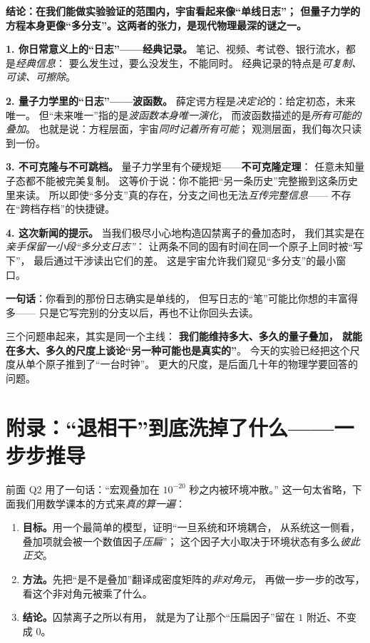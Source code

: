 \documentclass[11pt,a4paper]{ctexart}
\begin{document}
\begin{answerblock}
\textbf{结论：在我们能做实验验证的范围内，宇宙看起来像``单线日志''；
但量子力学的方程本身更像``多分支''。这两者的张力，是现代物理最深的谜之一。}

\smallskip
\textbf{1. 你日常意义上的``日志''——经典记录。}
笔记、视频、考试卷、银行流水，都是\emph{经典信息}：
要么发生过，要么没发生，不能同时。
经典记录的特点是\emph{可复制、可读、可擦除}。

\smallskip
\textbf{2. 量子力学里的``日志''——波函数。}
薛定谔方程是\emph{决定论}的：给定初态，未来唯一。
但``未来唯一''指的是\emph{波函数本身唯一演化}，
而波函数描述的是\emph{所有可能的叠加}。
也就是说：方程层面，宇宙\emph{同时记着所有可能}；
观测层面，我们每次只读到一份。

\smallskip
\textbf{3. 不可克隆与不可跳档。}
量子力学里有个硬规矩——\textbf{不可克隆定理}：
任意未知量子态都不能被完美复制。
这等价于说：你不能把``另一条历史''完整搬到这条历史里来读。
所以即使``多分支''真的存在，分支之间也无法\emph{互传完整信息}——
不存在``跨档存档''的快捷键。

\smallskip
\textbf{4. 这次新闻的提示。}
当我们极尽小心地构造囚禁离子的叠加态时，
我们其实是在\emph{亲手保留一小段``多分支日志''}：
让两条不同的固有时间在同一个原子上同时被``写下''，
最后通过干涉读出它们的差。
这是宇宙允许我们窥见``多分支''的最小窗口。

\smallskip
\textbf{一句话}：你看到的那份日志确实是单线的，
但写日志的``笔''可能比你想的丰富得多——
只是它写完别的分支以后，再也不让你回头去读。
\end{answerblock}

\begin{keypointblock}
三个问题串起来，其实是同一个主线：
\textbf{我们能维持多大、多久的量子叠加，
就能在多大、多久的尺度上谈论``另一种可能也是真实的''}。
今天的实验已经把这个尺度从单个原子推到了``一台时钟''。
更大的尺度，是后面几十年的物理学要回答的问题。
\end{keypointblock}

\section{附录：``退相干''到底洗掉了什么——一步步推导}

前面 Q2 用了一句话：``宏观叠加在 $10^{-20}$ 秒之内被环境冲散。''
这一句太省略，下面我们用数学课本的方式来\emph{真的算一遍}：

\begin{enumerate}
  \item \textbf{目标。}用一个最简单的模型，证明``一旦系统和环境耦合，
        从系统这一侧看，叠加项就会被一个数值因子\emph{压扁}''；
        这个因子大小取决于环境状态有多么\emph{彼此正交}。
  \item \textbf{方法。}先把``是不是叠加''翻译成密度矩阵的\emph{非对角元}，
        再做一步一步的改写，看这个非对角元被乘了什么。
  \item \textbf{结论。}囚禁离子之所以有用，
        就是为了让那个``压扁因子''留在 $1$ 附近、不变成 $0$。
\end{enumerate}
\end{document}
